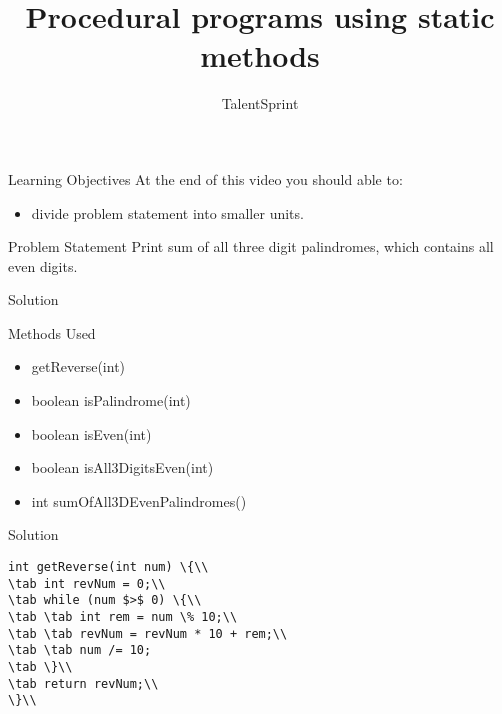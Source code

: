 \documentclass[aspectratio=169,14pt,usenames,dvipsnames]{beamer}
\title[Procedural programs using static methods]{Procedural programs using static methods}
\newcommand\tab[1][1cm]{\hspace*{#1}}
\begin{document}
{\1
\begin{frame} \vspace{35pt}

\subtitle{TalentSprint}
\maketitle
\end{frame}
}

\begin{frame}{Learning Objectives}
At the end of this video you should able to:
\begin{itemize}
\item divide problem statement into smaller units.
\end{itemize}
\end{frame}

\begin{frame}{Problem Statement}
Print sum of all three digit palindromes, which
contains all even digits.
\end{frame}



\begin{frame}{Solution}

\begin{block}{Methods Used}\\
\begin{itemize}
    \item getReverse(int)
    \item boolean isPalindrome(int)
    \item boolean isEven(int)
    \item boolean isAll3DigitsEven(int)
    \item int sumOfAll3DEvenPalindromes()
\end{itemize}
\end{block}
\end{frame}

\begin{frame}{Solution}
\begin{lstlisting}
int getReverse(int num) \{\\
\tab int revNum = 0;\\
\tab while (num $>$ 0) \{\\
\tab \tab int rem = num \% 10;\\
\tab \tab revNum = revNum * 10 + rem;\\
\tab \tab num /= 10;
\tab \}\\
\tab return revNum;\\
\}\\
\end{lstlisting}
\end{frame}
\end{document}
